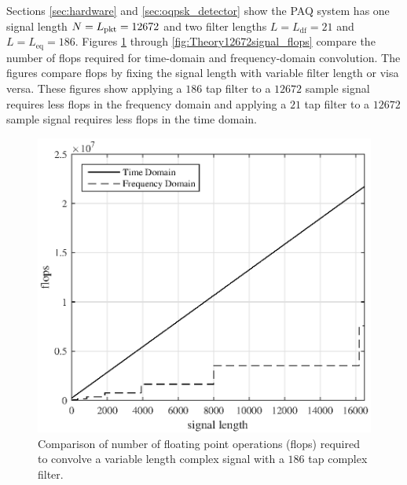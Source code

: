 Sections \ref{sec:hardware} and \ref{sec:oqpsk_detector} show the PAQ system has one signal length $N = L_\text{pkt} = 12672$ and two filter lengths $L = L_\text{df} = 21$ and $L = L_\text{eq} = 186$.
Figures \ref{fig:Theory186Tap_flops} through \ref{fig:Theory12672signal_flops} compare the number of flops required for time-domain and frequency-domain convolution.
The figures compare flops by fixing the signal length with variable filter length or visa versa.
These figures show applying a $186$ tap filter to a $12672$ sample signal requires less flops in the frequency domain and
applying a $21$ tap filter to a $12672$ sample signal requires less flops in the time domain.
\begin{figure}
	\centering\includegraphics[width=5in]{figures/gpu_intro/Theory186Tap_flops.eps}
	\caption{Comparison of number of floating point operations (flops) required to convolve a variable length complex signal with a $186$ tap complex filter.}
	\label{fig:Theory186Tap_flops}
\end{figure}
